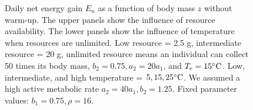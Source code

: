 \begin{figure}[H]
\begin{center}
\caption{
  Daily net energy gain  $E_n$ as a function of body mass $z$ without warm-up.
	The upper panels show the influence of resource availability.
	The lower panels show the influence of temperature when resources are unlimited.
	Low resource = 2.5 g, intermediate resource = 20 g, unlimited resource means an individual can collect 50 times its body mass, $b_2 = 0.75, a_2 = 20 a_1$, and $T_e = 15 ^{\circ} \rm{C}$. 
	Low, intermediate, and high temperature = $5, 15, 25 ^{\circ} \rm{C}$.
	We assumed a high active metabolic rate $a_2 = 40 a_1, b_2  = 1.25$.
	Fixed parameter values: $b_1 = 0.75, \rho = 16$.
}
\label{fig2}
\end{center}
\end{figure}
\newpage
%
